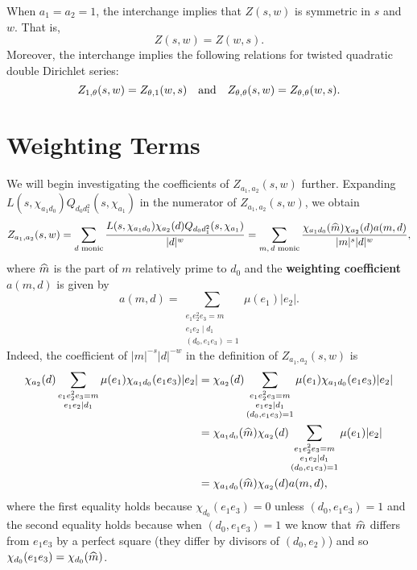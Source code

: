 \documentclass[12pt,reqno,oneside]{amsart}
\begin{document}
    \begin{remark}\label{rem:symmetry_of_Double_Dirichlet_series}
        When $a_{1} = a_{2} = 1$, the interchange implies that $Z(s,w)$ is symmetric in $s$ and $w$. That is,
        \[
            Z(s,w) = Z(w,s).
        \]
        Moreover, the interchange implies the following relations for twisted quadratic double Dirichlet series:
        \[
            Z_{1,\theta}(s,w) = Z_{\theta,1}(w,s) \quad \text{and} \quad Z_{\theta,\theta}(s,w) = Z_{\theta,\theta}(w,s).
        \]
    \end{remark}
\section{Weighting Terms}
    We will begin investigating the coefficients of $Z_{a_{1},a_{2}}(s,w)$ further. Expanding $L(s,\chi_{a_{1}d_{0}})Q_{d_{0}d_{1}^{2}}(s,\chi_{a_{1}})$ in the numerator of $Z_{a_{1},a_{2}}(s,w)$, we obtain
    \[
        Z_{a_{1},a_{2}}(s,w) = \sum_{\text{$d$ monic}}\frac{L(s,\chi_{a_{1}d_{0}})\chi_{a_{2}}(d)Q_{d_{0}d_{1}^{2}}(s,\chi_{a_{1}})}{|d|^{w}} = \sum_{\text{$m,d$ monic}}\frac{\chi_{a_{1}d_{0}}(\widehat{m})\chi_{a_{2}}(d)a(m,d)}{|m|^{s}|d|^{w}},
    \]
    where $\widehat{m}$ is the part of $m$ relatively prime to $d_{0}$ and the \textbf{weighting coefficient} $a(m,d)$ is given by
    \[
        a(m,d) = \sum_{\substack{e_{1}e_{2}^{2}e_{3} = m \\ e_{1}e_{2} \mid d_{1} \\ (d_{0},e_{1}e_{3}) = 1}}\mu(e_{1})|e_{2}|.
    \]
    Indeed, the coefficient of $|m|^{-s}|d|^{-w}$ in the definition of $Z_{a_{1},a_{2}}(s,w)$ is
    \begin{align*}
        \chi_{a_{2}}(d)\sum_{\substack{e_{1}e_{2}^{2}e_{3} = m \\ e_{1}e_{2} \mid d_{1}}}\mu(e_{1})\chi_{a_{1}d_{0}}(e_{1}e_{3})|e_{2}| &= \chi_{a_{2}}(d)\sum_{\substack{e_{1}e_{2}^{2}e_{3} = m \\ e_{1}e_{2} \mid d_{1} \\ (d_{0},e_{1}e_{3}) = 1}}\mu(e_{1})\chi_{a_{1}d_{0}}(e_{1}e_{3})|e_{2}| \\
        &= \chi_{a_{1}d_{0}}(\widehat{m})\chi_{a_{2}}(d)\sum_{\substack{e_{1}e_{2}^{2}e_{3} = m \\ e_{1}e_{2} \mid d_{1} \\ (d_{0},e_{1}e_{3}) = 1}}\mu(e_{1})|e_{2}| \\
        &= \chi_{a_{1}d_{0}}(\widehat{m})\chi_{a_{2}}(d)a(m,d),
    \end{align*}
    where the first equality holds because $\chi_{d_{0}}(e_{1}e_{3}) = 0$ unless $(d_{0},e_{1}e_{3}) = 1$ and the second equality holds because when $(d_{0},e_{1}e_{3}) = 1$ we know that $\widehat{m}$ differs from $e_{1}e_{3}$ by a perfect square (they differ by divisors of $(d_{0},e_{2})$) and so $\chi_{d_{0}}(e_{1}e_{3}) = \chi_{d_{0}}(\widehat{m})$. 
    
\end{document}
